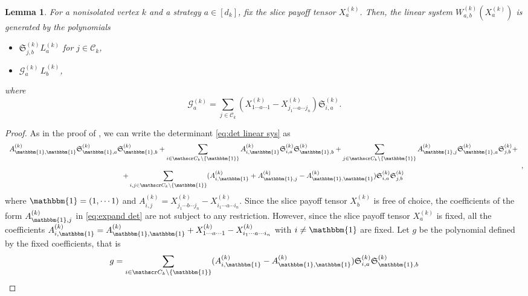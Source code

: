 \documentclass[11pt]{amsart}
\numberwithin{equation}{section}
\theoremstyle{plain}
\numberwithin{theorem}{section}
\newtheorem{lemma}[theorem]{Lemma}
\theoremstyle{definition}
\begin{document}
\begin{lemma}\label{lemma:gens lin system}
    For a nonisolated vertex $k$ and a strategy $a\in[d_k]$, fix the slice payoff tensor $X^{(k)}_a$. Then, the linear system $W_{a,b}^{(k)}(X^{(k)}_a)$ is generated by the polynomials

    \begin{itemize}
        \item $ \mathfrak S_{j,b}^{(k)} L_{a}^{(k)}$ for $j\in\mathscr C_k
        $,
\item $\mathcal G_a^{(k)}\,L_b^{(k)}$,
    \end{itemize}
    where
    \[
 \mathcal G_a^{(k)}= \sum_{j\in\mathscr C_k} 
(X^{(k)}_{1\cdots a\cdots 1}-X^{(k)}_{j_1\cdots a\cdots j_n})
\mathfrak S_{i,a}^{(k)}.
    \]
\end{lemma}
\begin{proof}
    As in the proof of \cite[Lemma 7]{portakal2024game}, we can write the determinant \eqref{eq:det linear sys} as 
    \begin{equation}\label{eq:expand det}
    \begin{array}{c}
\displaystyle  A^{(k)}_{\mathbbm{1},\mathbbm{1}}\mathfrak S_{\mathbbm{1},a}^{(k)}\mathfrak S_{\mathbbm{1},b}^{(k)}+
\sum_{i\in\mathscr C_k\setminus\{\mathbbm{1}\}} A^{(k)}_{i,\mathbbm{1}}\mathfrak S_{i,a}^{(k)}\mathfrak S_{\mathbbm{1},b}^{(k)}+
\sum_{j\in\mathscr C_k\setminus\{\mathbbm{1}\}} A^{(k)}_{\mathbbm{1},j}\mathfrak S_{\mathbbm{1},a}^{(k)}\mathfrak S_{j,b}^{(k)}+\\ \\ \displaystyle+
\sum_{i,j\in\mathscr C_k\setminus\{\mathbbm{1}\}}(A^{(k)}_{i,\mathbbm{1}}+ A^{(k)}_{\mathbbm{1},j}-A^{(k)}_{\mathbbm{1},\mathbbm{1}}  )
\mathfrak S_{i,a}^{(k)}\mathfrak S_{j,b}^{(k)}
\end{array},
    \end{equation}
    where $\mathbbm{1}=(1,\cdots 1)$ and 
    $
    A_{i,j}^{(k)}=X^{(k)}_{j_1\cdots b\cdots j_n}-X^{(k)}_{i_1\cdots a\cdots i_n}.
    $
Since the slice payoff tensor $X^{(k)}_b$ is free of choice, the coefficients of the form $A^{(k)}_{\mathbbm{1},j}$  in \eqref{eq:expand det} are not subject to any restriction. However,
since the slice payoff tensor $X^{(k)}_a$ is fixed,  all the coefficients $A^{(k)}_{i,\mathbbm{1}}=A^{(k)}_{\mathbbm{1},\mathbbm{1}}+X_{1\cdots a\cdots1}^{(k)}-X_{i_1\cdots a\cdots i_n}^{(k)}$ with $i\neq \mathbbm{1}$ are fixed. 
Let $g$ be the polynomial defined by the fixed coefficients, that is
\[
g= 
\sum_{i\in\mathscr C_k\setminus\{\mathbbm{1}\}} (A^{(k)}_{i,\mathbbm{1}}-A^{(k)}_{\mathbbm{1},\mathbbm{1}})\mathfrak S_{i,a}^{(k)}\mathfrak S_{\mathbbm{1},b}^{(k)}
\]
\end{proof}
\end{document}
